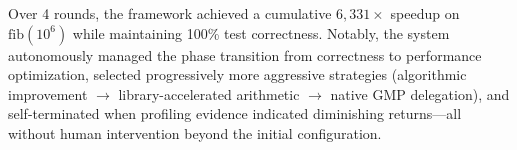 Over 4 rounds, the framework achieved a cumulative $6{,}331\times$ speedup on $\mathrm{fib}(10^6)$ while maintaining 100\% test correctness. Notably, the system autonomously managed the phase transition from correctness to performance optimization, selected progressively more aggressive strategies (algorithmic improvement $\to$ library-accelerated arithmetic $\to$ native GMP delegation), and self-terminated when profiling evidence indicated diminishing returns---all without human intervention beyond the initial configuration.
